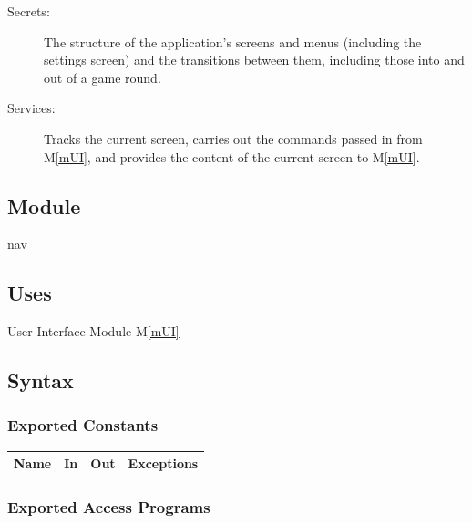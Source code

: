 \documentclass[12pt, titlepage]{article}
\newcommand{\mref}[1]{M\ref{#1}}
\begin{document}
\begin{description}
\item[Secrets:] The structure of the application's screens and menus (including the settings screen) and the transitions between them, including those into and out of a game round.
\item[Services:] Tracks the current screen, carries out the commands passed in from \mref{mUI}, and provides the content of the current screen to \mref{mUI}.
\end{description}

\subsection{Module}

nav

\subsection{Uses}

User Interface Module \mref{mUI}



\subsection{Syntax}

\subsubsection{Exported Constants}

\begin{center}
\begin{tabular}{p{4cm} p{4cm} p{4cm} p{4cm}}
\hline
\textbf{Name} & \textbf{In} & \textbf{Out} & \textbf{Exceptions} \\
\hline


\hline
\end{tabular}
\end{center}

\subsubsection{Exported Access Programs}
\end{document}
